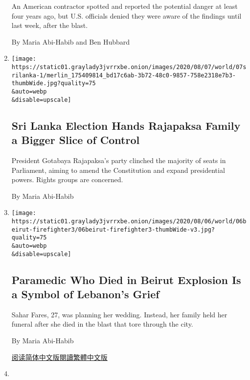 \begin{enumerate}
  An American contractor spotted and reported the potential danger at
  least four years ago, but U.S. officials denied they were aware of the
  findings until last week, after the blast.

  By Maria Abi-Habib and Ben Hubbard
\item
  \href{/2020/08/06/world/asia/sri-lanka-elections-rajapaksa.html}{}

  \texttt{[image: https://static01.graylady3jvrrxbe.onion/images/2020/08/07/world/07srilanka-1/merlin\_175409814\_bd17c6ab-3b72-48c0-9857-758e2318e7b3-thumbWide.jpg?quality=75\\\&auto=webp\\\&disable=upscale]}

  \hypertarget{sri-lanka-election-hands-rajapaksa-family-a-bigger-slice-of-control}{%
  \subsection{Sri Lanka Election Hands Rajapaksa Family a Bigger Slice
  of
  Control}\label{sri-lanka-election-hands-rajapaksa-family-a-bigger-slice-of-control}}

  President Gotabaya Rajapaksa's party clinched the majority of seats in
  Parliament, aiming to amend the Constitution and expand presidential
  powers. Rights groups are concerned.

  By Maria Abi-Habib
\item
  \href{/2020/08/06/world/middleeast/Beirut-explosion-paramedic-Fares.html}{}

  \texttt{[image: https://static01.graylady3jvrrxbe.onion/images/2020/08/06/world/06beirut-firefighter3/06beirut-firefighter3-thumbWide-v3.jpg?quality=75\\\&auto=webp\\\&disable=upscale]}

  \hypertarget{paramedic-who-died-in-beirut-explosion-is-a-symbol-of-lebanons-grief}{%
  \subsection{Paramedic Who Died in Beirut Explosion Is a Symbol of
  Lebanon's
  Grief}\label{paramedic-who-died-in-beirut-explosion-is-a-symbol-of-lebanons-grief}}

  Sahar Fares, 27, was planning her wedding. Instead, her family held
  her funeral after she died in the blast that tore through the city.

  By Maria Abi-Habib

  \href{https://cn.nytimes3xbfgragh.onion/world/20200807/beirut-explosion-paramedic-fares/}{阅读简体中文版}\href{https://cn.nytimes3xbfgragh.onion/world/20200807/beirut-explosion-paramedic-fares/zh-hant/}{閱讀繁體中文版}
\item
  \href{/2020/08/04/world/asia/pakistan-hindu-conversion.html}{}


\end{enumerate}
